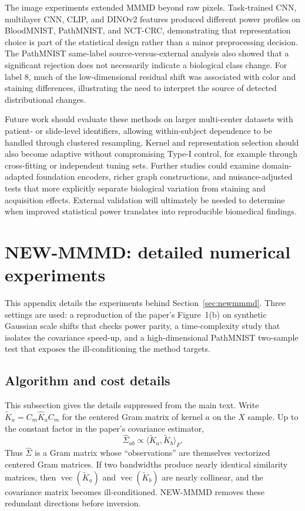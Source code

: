 \documentclass[12pt]{article}
\begin{document}
The image experiments extended MMMD beyond raw pixels. Task-trained CNN, multilayer CNN, CLIP, and DINOv2 features produced different power profiles on BloodMNIST, PathMNIST, and NCT-CRC, demonstrating that representation choice is part of the statistical design rather than a minor preprocessing decision. The PathMNIST same-label source-versus-external analysis also showed that a significant rejection does not necessarily indicate a biological class change. For label 8, much of the low-dimensional residual shift was associated with color and staining differences, illustrating the need to interpret the source of detected distributional changes.

Future work should evaluate these methods on larger multi-center datasets with patient- or slide-level identifiers, allowing within-subject dependence to be handled through clustered resampling. Kernel and representation selection should also become adaptive without compromising Type-I control, for example through cross-fitting or independent tuning sets. Further studies could examine domain-adapted foundation encoders, richer graph constructions, and nuisance-adjusted tests that more explicitly separate biological variation from staining and acquisition effects. External validation will ultimately be needed to determine when improved statistical power translates into reproducible biomedical findings.

\endgroup
\clearpage
\appendix
\section{NEW-MMMD: detailed numerical experiments}
\label{app:newmmmd}

This appendix details the experiments behind Section~\ref{sec:newmmmd}. Three settings are used: a reproduction of the paper's Figure~1(b) on synthetic Gaussian scale shifts that checks power parity, a time-complexity study that isolates the covariance speed-up, and a high-dimensional PathMNIST two-sample test that exposes the ill-conditioning the method targets.

\subsection{Algorithm and cost details}
\label{app:newmmmd-algorithm}
\label{app:newmmmd-complexity}

This subsection gives the details suppressed from the main text. Write $\widetilde{K}_a=C_m\widehat{K}_aC_m$ for the centered Gram matrix of kernel $a$ on the $X$ sample. Up to the constant factor in the paper's covariance estimator,
\[
  \widehat{\Sigma}_{ab}\propto \langle \widetilde{K}_a,\widetilde{K}_b\rangle_F.
\]
Thus $\widehat{\Sigma}$ is a Gram matrix whose ``observations'' are themselves vectorized centered Gram matrices. If two bandwidths produce nearly identical similarity matrices, then $\operatorname{vec}(\widetilde{K}_a)$ and $\operatorname{vec}(\widetilde{K}_b)$ are nearly collinear, and the covariance matrix becomes ill-conditioned. NEW-MMMD removes these redundant directions before inversion.
\end{document}
